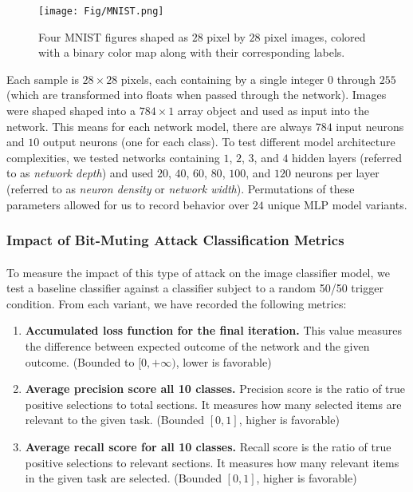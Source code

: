 \documentclass[12pt,letterpaper]{article}
\begin{document}
\begin{figure}[h]
	\label{MNIST}
	\centering
	\texttt{[image: Fig/MNIST.png]}
	\caption{Four MNIST figures shaped as $28$ pixel by $28$ pixel images, colored with a binary color map along with their corresponding labels.}
\end{figure}

Each sample is $28 \times 28$ pixels, each containing by a single integer $0$ through $255$ (which are transformed into floats when passed through the network). Images were shaped shaped into a $784 \times 1$ array object and used as input into the network. This means for each network model, there are always $784$ input neurons and $10$ output neurons (one for each class). To test different model architecture complexities, we tested networks containing $1$, $2$, $3$, and $4$ hidden layers (referred to as \textit{network depth}) and used $20$, $40$, $60$, $80$, $100$, and $120$ neurons per layer (referred to as \textit{neuron density} or \textit{network width}). Permutations of these parameters allowed for us to record behavior over $24$ unique MLP model variants.

\subsubsection{Impact of Bit-Muting Attack Classification Metrics}

\paragraph*{}To measure the impact of this type of attack on the image classifier model, we test a baseline classifier against a classifier subject to a random 50/50 trigger condition. From each variant, we have recorded the following metrics:

\begin{enumerate}
\item \textbf{Accumulated loss function for the final iteration.} This value measures the difference between expected outcome of the network and the given outcome. (Bounded to $[0,+\infty)$, lower is favorable)
\item \textbf{Average precision score all 10 classes.} Precision score is the ratio of true positive selections to total sections. It measures how many selected items are relevant to the given task. (Bounded $[0,1]$, higher is favorable)
\item \textbf{Average recall score for all 10 classes.} Recall score is the ratio of true positive selections to relevant sections. It measures how many relevant items in the given task are selected. (Bounded $[0,1]$, higher is favorable)
\end{enumerate} 
\end{document}
